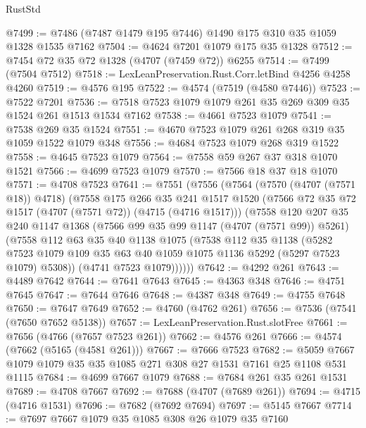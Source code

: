\begin{lexlean}{RustStd}
\begin{coremodule}
@7499 := @7486 (@7487 @1479 @195 @7446) @1490 @175 @310 @35 @1059 @1328 @1535 @7162
@7504 := @4624 @7201 @1079 @175 @35 @1328
@7512 := @7454 @72 @35 @72 @1328 (@4707 (@7459 @72)) @6255
@7514 := @7499 (@7504 @7512)
@7518 := LexLeanPreservation.Rust.Corr.letBind @4256 @4258 @4260
@7519 := @4576 @195
@7522 := @4574 (@7519 (@4580 @7446))
@7523 := @7522 @7201
@7536 := @7518 @7523 @1079 @1079 @261 @35 @269 @309 @35 @1524 @261 @1513 @1534 @7162
@7538 := @4661 @7523 @1079
@7541 := @7538 @269 @35 @1524
@7551 := @4670 @7523 @1079 @261 @268 @319 @35 @1059 @1522 @1079 @348
@7556 := @4684 @7523 @1079 @268 @319 @1522
@7558 := @4645 @7523 @1079
@7564 := @7558 @59 @267 @37 @318 @1070 @1521
@7566 := @4699 @7523 @1079
@7570 := @7566 @18 @37 @18 @1070
@7571 := @4708 @7523
@7641 := @7551
    (@7556
      (@7564
        (@7570 (@4707 (@7571 @18)) @4718)
        (@7558
          @175
          @266
          @35
          @241
          @1517
          @1520
          (@7566 @72 @35 @72 @1517 (@4707 (@7571 @72)) (@4715 (@4716 @1517)))
          (@7558
            @120
            @207
            @35
            @240
            @1147
            @1368
            (@7566 @99 @35 @99 @1147 (@4707 (@7571 @99)) @5261)
            (@7558
              @112
              @63
              @35
              @40
              @1138
              @1075
              (@7538
                @112
                @35
                @1138
                (@5282
                  @7523
                  @1079
                  @109
                  @35
                  @63
                  @40
                  @1059
                  @1075
                  @1136
                  @5292
                  (@5297 @7523 @1079)
                  @5308))
              (@4741 @7523 @1079))))))
@7642 := @4292 @261
@7643 := @4489 @7642
@7644 := @7641 @7643
@7645 := @4363 @348
@7646 := @4751 @7645
@7647 := @7644 @7646
@7648 := @4387 @348
@7649 := @4755 @7648
@7650 := @7647 @7649
@7652 := @4760 (@4762 @261)
@7656 := @7536 (@7541 (@7650 @7652 @5138))
@7657 := LexLeanPreservation.Rust.slotFree
@7661 := @7656 (@4766 (@7657 @7523 @261))
@7662 := @4576 @261
@7666 := @4574 (@7662 (@5165 (@4581 @261)))
@7667 := @7666 @7523
@7682 := @5059 @7667 @1079 @1079 @35 @35 @1085 @271 @308 @27 @1531 @7161 @25 @1108 @531 @1115
@7684 := @4699 @7667 @1079
@7688 := @7684 @261 @35 @261 @1531
@7689 := @4708 @7667
@7692 := @7688 (@4707 (@7689 @261))
@7694 := @4715 (@4716 @1531)
@7696 := @7682 (@7692 @7694)
@7697 := @5145 @7667
@7714 := @7697
    @7667
    @1079
    @35
    @1085
    @308
    @26
    @1079
    @35
    @7160

\end{coremodule}
\end{lexlean}
